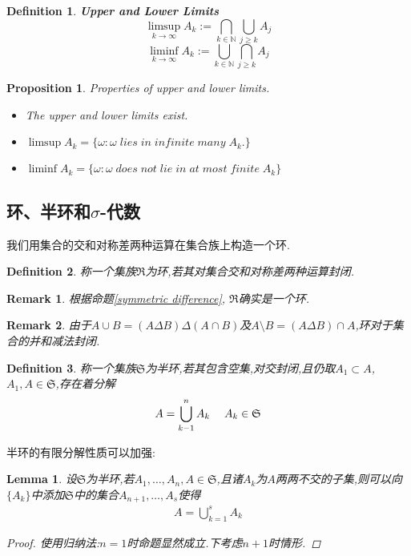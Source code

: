 \documentclass{book}
\newtheorem{definition}{Definition}
\newtheorem{proposition}{Proposition}
\newtheorem{lemma}{Lemma}
\newtheorem{remark}{Remark}
\begin{document}
\begin{CJK}{UTF8}{gbsn}
\begin{definition}
	\textbf{Upper and Lower Limits}
	$$\limsup_{k\rightarrow \infty}A_k:=\bigcap_{k\in \mathbb{N}}\bigcup_{j\geq k}A_j$$
	$$\liminf_{k\rightarrow \infty}A_k:=\bigcup_{k\in \mathbb{N}}\bigcap_{j\geq k}A_j$$
\end{definition}

\begin{proposition}
Properties of upper and lower limits.\par 
	\begin{itemize}
		\item The upper and lower limits exist.
		\item $\limsup A_k=\{\omega:\omega \; lies \; in\; infinite\; many\; A_k.\}$
		\item $\liminf A_k=\{\omega:\omega\; does\; not\; lie\; in\; at\; most\; finite\; A_k \}$
	\end{itemize}
\end{proposition}



\subsection{环、半环和$\sigma$-代数}
我们用集合的交和对称差两种运算在集合族上构造一个环.
\begin{definition}\label{ring}
	称一个集族$\mathfrak{R}$为环,若其对集合交和对称差两种运算封闭.
\end{definition}
\begin{remark}
	根据命题\ref{symmetric difference}, $\mathfrak{R}$确实是一个环.
\end{remark}
\begin{remark}
	由于$A\cup B=(A\Delta B)\Delta(A\cap B)$及$A\setminus B=(A\Delta B)\cap A$,环对于集合的并和减法封闭.
\end{remark}









\begin{definition}
	称一个集族$\mathfrak{S}$为半环,若其包含空集,对交封闭,且仍取$A_1\subset A$,$A_1,A\in \mathfrak{S}$,存在着分解
	\begin{align*}
		A=\bigcup_{k-1}^nA_k \hspace{3ex}A_k\in \mathfrak{S}
	\end{align*}
\end{definition}


半环的有限分解性质可以加强:
\begin{lemma}
	设$\mathfrak{S}$为半环,若$A_1,\dots,A_n,A \in \mathfrak{S}$,且诸$A_k$为$A$两两不交的子集,则可以向$\{A_k\}$中添加$\mathfrak{S}$中的集合$A_{n+1},\dots,A_s$使得
	\begin{align*}
		A=\bigcup_{k=1}^sA_k
	\end{align*}
	\begin{proof}
		使用归纳法:$n=1$时命题显然成立.下考虑$n+1$时情形.
	\end{proof}
\end{lemma}








\end{CJK}
\end{document}
